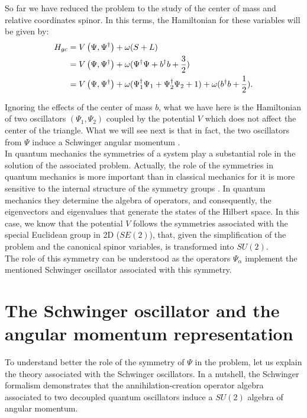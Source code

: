 
So far we have reduced the problem to the study of the center of mass and relative coordinates spinor. In this terms, the Hamiltonian for these variables will be given by:\\

\begin{align*}
H_{gc} &= V\left( \Psi,\Psi^\dagger \right)+ \omega (S+L)\\
&= V\left( \Psi,\Psi^\dagger \right) + \omega(\Psi^\dagger\Psi + b^\dagger b +\frac{3}{2})\\
&= V\left( \Psi,\Psi^\dagger \right) + \omega(\Psi_1^\dagger\Psi_1 +\Psi_2^\dagger\Psi_2+ 1) +\omega(b^\dagger b +\frac{1}{2}).
\end{align*}

Ignoring the effects of the center of mass $b$, what we have here is the Hamiltonian of two oscillators $(\Psi_1,\Psi_2)$ coupled by the potential $V$ which does not affect the center of the triangle. What we will see next is that in fact, the two oscillators from $\Psi$ induce a Schwinger angular momentum \cite{Schwinger}.\\

In quantum mechanics the symmetries of a system play a substantial role in the solution of the associated problem. Actually, the role of the symmetries in quantum mechanics is more important than in classical mechanics for it is more sensitive to the internal structure of the symmetry groups \cite{qfhebook}. In quantum mechanics they determine the algebra of operators, and consequently, the eigenvectors and eigenvalues that generate the states of the Hilbert space. In this case, we know that the potential $V$ follows the symmetries associated with the special Euclidean group in 2D ($SE(2)$), that, given the simplification of the problem and the canonical spinor variables, is transformed into $SU(2)$.\\

The role of this symmetry can be understood as the operators $\Psi_\alpha$ implement the mentioned Schwinger oscillator \cite{Schwinger} associated with this symmetry.\\

\section{The Schwinger oscillator and the angular momentum representation}
To understand better the role of the symmetry of $\Psi$ in the problem, let us explain the theory associated with the Schwinger oscillators. In a nutshell, the Schwinger formalism demonstrates that the annihilation-creation operator algebra associated to two decoupled quantum oscillators induce a $SU(2)$ algebra of angular momentum.\\

